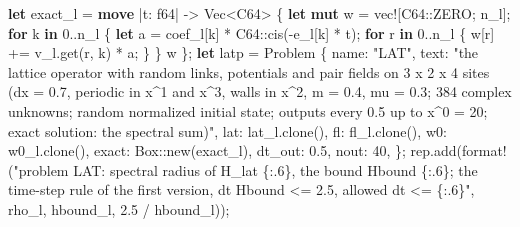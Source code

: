 \documentclass[
  10pt,
]{article}
\newenvironment{Shaded}{}{}
\newcommand{\ControlFlowTok}[1]{\textcolor[rgb]{0.00,0.44,0.13}{\textbf{#1}}}
\newcommand{\DataTypeTok}[1]{\textcolor[rgb]{0.56,0.13,0.00}{#1}}
\newcommand{\DecValTok}[1]{\textcolor[rgb]{0.25,0.63,0.44}{#1}}
\newcommand{\KeywordTok}[1]{\textcolor[rgb]{0.00,0.44,0.13}{\textbf{#1}}}
\newcommand{\NormalTok}[1]{#1}
\newcommand{\OperatorTok}[1]{\textcolor[rgb]{0.40,0.40,0.40}{#1}}
\newcommand{\PreprocessorTok}[1]{\textcolor[rgb]{0.74,0.48,0.00}{#1}}
\newcommand{\StringTok}[1]{\textcolor[rgb]{0.25,0.44,0.63}{#1}}
\begin{document}
\begin{Shaded}
\begin{Highlighting}[]
    \KeywordTok{let}\NormalTok{ exact\_l }\OperatorTok{=} \KeywordTok{move} \OperatorTok{|}\NormalTok{t}\OperatorTok{:} \DataTypeTok{f64}\OperatorTok{|} \OperatorTok{{-}\textgreater{}} \DataTypeTok{Vec}\OperatorTok{\textless{}}\NormalTok{C64}\OperatorTok{\textgreater{}} \OperatorTok{\{}
        \KeywordTok{let} \KeywordTok{mut}\NormalTok{ w }\OperatorTok{=} \PreprocessorTok{vec!}\NormalTok{[}\PreprocessorTok{C64::}\NormalTok{ZERO}\OperatorTok{;}\NormalTok{ n\_l]}\OperatorTok{;}
        \ControlFlowTok{for}\NormalTok{ k }\KeywordTok{in} \DecValTok{0}\OperatorTok{..}\NormalTok{n\_l }\OperatorTok{\{}
            \KeywordTok{let}\NormalTok{ a }\OperatorTok{=}\NormalTok{ coef\_l[k] }\OperatorTok{*} \PreprocessorTok{C64::}\NormalTok{cis(}\OperatorTok{{-}}\NormalTok{e\_l[k] }\OperatorTok{*}\NormalTok{ t)}\OperatorTok{;}
            \ControlFlowTok{for}\NormalTok{ r }\KeywordTok{in} \DecValTok{0}\OperatorTok{..}\NormalTok{n\_l }\OperatorTok{\{}
\NormalTok{                w[r] }\OperatorTok{+=}\NormalTok{ v\_l}\OperatorTok{.}\NormalTok{get(r}\OperatorTok{,}\NormalTok{ k) }\OperatorTok{*}\NormalTok{ a}\OperatorTok{;}
            \OperatorTok{\}}
        \OperatorTok{\}}
\NormalTok{        w}
    \OperatorTok{\};}
    \KeywordTok{let}\NormalTok{ latp }\OperatorTok{=}\NormalTok{ Problem }\OperatorTok{\{}
\NormalTok{        name}\OperatorTok{:} \StringTok{"LAT"}\OperatorTok{,}
\NormalTok{        text}\OperatorTok{:} \StringTok{"the lattice operator with random links, potentials and pair fields on 3 x 2 x 4 sites (dx = 0.7, periodic in x\^{}1 and x\^{}3, walls in x\^{}2, m = 0.4, mu = 0.3; 384 complex unknowns; random normalized initial state; outputs every 0.5 up to x\^{}0 = 20; exact solution: the spectral sum)"}\OperatorTok{,}
\NormalTok{        lat}\OperatorTok{:}\NormalTok{ lat\_l}\OperatorTok{.}\NormalTok{clone()}\OperatorTok{,}
\NormalTok{        fl}\OperatorTok{:}\NormalTok{ fl\_l}\OperatorTok{.}\NormalTok{clone()}\OperatorTok{,}
\NormalTok{        w0}\OperatorTok{:}\NormalTok{ w0\_l}\OperatorTok{.}\NormalTok{clone()}\OperatorTok{,}
\NormalTok{        exact}\OperatorTok{:} \DataTypeTok{Box}\PreprocessorTok{::}\NormalTok{new(exact\_l)}\OperatorTok{,}
\NormalTok{        dt\_out}\OperatorTok{:} \DecValTok{0.5}\OperatorTok{,}
\NormalTok{        nout}\OperatorTok{:} \DecValTok{40}\OperatorTok{,}
    \OperatorTok{\};}
\NormalTok{    rep}\OperatorTok{.}\NormalTok{add(}\PreprocessorTok{format!}\NormalTok{(}\StringTok{"problem LAT: spectral radius of H\_lat \{:.6\}, the bound Hbound \{:.6\}; the time{-}step rule of the first version, dt Hbound \textless{}= 2.5, allowed dt \textless{}= \{:.6\}"}\OperatorTok{,}\NormalTok{ rho\_l}\OperatorTok{,}\NormalTok{ hbound\_l}\OperatorTok{,} \DecValTok{2.5} \OperatorTok{/}\NormalTok{ hbound\_l))}\OperatorTok{;}


\end{Highlighting}
\end{Shaded}
\end{document}
